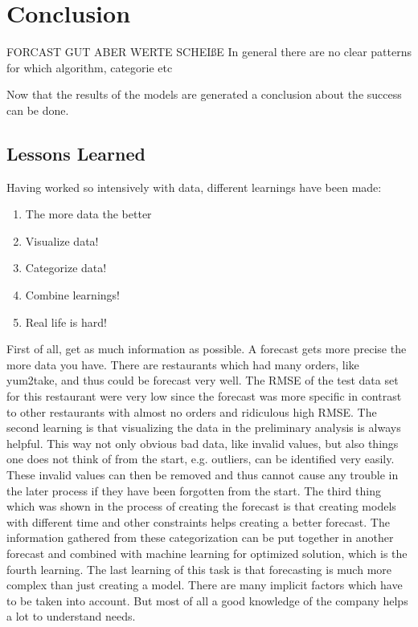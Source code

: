 \chapter{Conclusion}\label{chapter:Conclusion}

FORCAST GUT ABER WERTE SCHEIßE
In general there are no clear patterns for which algorithm, categorie etc

Now that the results of the models are generated a conclusion about the success can be done.
\section{Lessons Learned}
Having worked so intensively with data, different learnings have been made:

\begin{enumerate}
\item The more data the better
\item Visualize data!
\item Categorize data!
\item Combine learnings!
\item Real life is hard!
\end{enumerate}

First of all, get as much information as possible. A forecast gets more precise the more data you have. There are restaurants which had many orders, like yum2take, and thus could be forecast very well. The RMSE of the test data set for this restaurant were very low since the forecast was more specific in contrast to other restaurants with almost no orders and ridiculous high RMSE.\newline
The second learning is that visualizing the data in the preliminary analysis is always helpful. This way not only obvious bad data, like invalid values, but also things one does not think of from the start, e.g. outliers, can be identified very easily. These invalid values can then be removed and thus cannot cause any trouble in the later process if they have been forgotten from the start.\newline
The third thing which was shown in the process of creating the forecast is that creating models with different time and other constraints helps creating a better forecast. The information gathered from these categorization can be put together in another forecast and combined with machine learning for optimized solution, which is the fourth learning.\newline
The last learning of this task is that forecasting is much more complex than just creating a model. There are many implicit factors which have to be taken into account. But most of all a good knowledge of the company helps a lot to understand needs.
